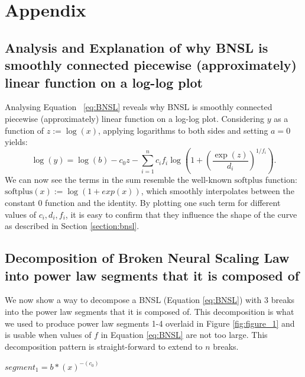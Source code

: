 \documentclass{article} %
\begin{document}


\clearpage 
\appendix
%
\section{Appendix}


\subsection{Analysis and Explanation of why BNSL is smoothly connected piecewise (approximately) linear function on a log-log plot}
\label{section:bnsl_analysis}

Analysing Equation ~\ref{eq:BNSL} reveals why BNSL is smoothly connected piecewise (approximately) linear function on a log-log plot. %
Considering $y$ as a function of $z:=\log(x)$, applying logarithms to both sides and setting $a=0$ yields:
\begin{equation}
\log (y) =  \log (b) - c_0 z -  \sum_{i=1}^n c_i f_i \log\left(1 + \left(\frac{\exp(z)}{d_i}\right)^{1/f_i}\right).
\end{equation}
We can now see the terms in the sum resemble the well-known $\mathrm{softplus}$ function: $\mathrm{softplus}(x) := \log(1 + exp(x))$, which smoothly interpolates between the constant 0 function and the identity.
By plotting one such term for different values of $c_i, d_i, f_i$, it is easy to confirm that they influence the shape of the curve as described in Section \ref{section:bnsl}.


\subsection{Decomposition of Broken Neural Scaling Law into power law segments that it is composed of}
\label{section:decomposition_of_BNSL}

We now show a way to decompose a BNSL (Equation \ref{eq:BNSL}) with 3 breaks into the power law segments that it is composed of. This decomposition is what we used to produce power law segments 1-4 overlaid in Figure \ref{fig:figure_1} and is usable when values of $f$ in Equation \ref{eq:BNSL} are not too large. This decomposition pattern is straight-forward to extend to $n$ breaks.

$segment_1 = b * (x)^{-(c_0)}$
\end{document}
